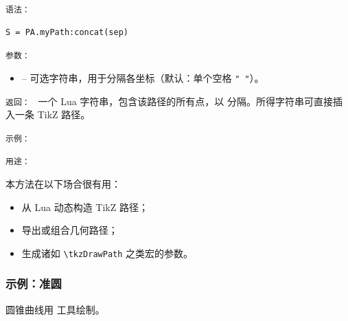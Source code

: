 \medskip
\texttt{语法： }
\begin{verbatim}
S = PA.myPath:concat(sep)
\end{verbatim}

\medskip
\texttt{参数： }
\begin{itemize}
  \item {} – 可选字符串，用于分隔各坐标（默认：单个空格 \verb|" "|）。
\end{itemize}

\medskip
\texttt{返回： }
一个 Lua 字符串，包含该路径的所有点，以  分隔。所得字符串可直接插入一条 TikZ 路径。

\texttt{示例： }

\begin{tkzexample}
\end{tkzexample}


\texttt{用途： }

本方法在以下场合很有用：
\begin{itemize}
  \item 从 Lua 动态构造 TikZ 路径；
  \item 导出或组合几何路径；
  \item 生成诸如 \verb|\tkzDrawPath| 之类宏的参数。
\end{itemize}


\subsubsection{示例：准圆}
\label{ssub:director_circle}


圆锥曲线用  工具绘制。

